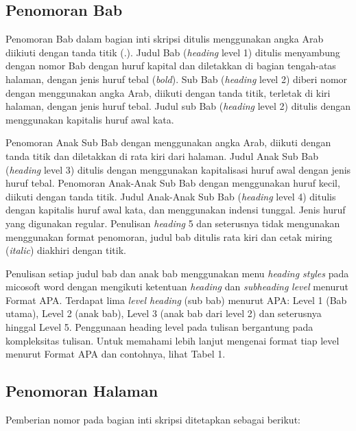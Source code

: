 \documentclass[
  indonesian,
  letterpaper,
]{scrbook}
\begin{document}
\subsection{Penomoran Bab}\label{penomoran-bab}

Penomoran Bab dalam bagian inti skripsi ditulis menggunakan angka Arab
diikiuti dengan tanda titik (.). Judul Bab (\emph{heading} level 1)
ditulis menyambung dengan nomor Bab dengan huruf kapital dan diletakkan
di bagian tengah-atas halaman, dengan jenis huruf tebal (\emph{bold}).
Sub Bab (\emph{heading} level 2) diberi nomor dengan menggunakan angka
Arab, diikuti dengan tanda titik, terletak di kiri halaman, dengan jenis
huruf tebal. Judul sub Bab (\emph{heading} level 2) ditulis dengan
menggunakan kapitalis huruf awal kata.

Penomoran Anak Sub Bab dengan menggunakan angka Arab, diikuti dengan
tanda titik dan diletakkan di rata kiri dari halaman. Judul Anak Sub Bab
(\emph{heading} level 3) ditulis dengan menggunakan kapitalisasi huruf
awal dengan jenis huruf tebal. Penomoran Anak-Anak Sub Bab dengan
menggunakan huruf kecil, diikuti dengan tanda titik. Judul Anak-Anak Sub
Bab (\emph{heading} level 4) ditulis dengan kapitalis huruf awal kata,
dan menggunakan indensi tunggal. Jenis huruf yang digunakan regular.
Penulisan \emph{heading} 5 dan seterusnya tidak mengunakan menggunakan
format penomoran, judul bab ditulis rata kiri dan cetak miring
(\emph{italic}) diakhiri dengan titik.

Penulisan setiap judul bab dan anak bab menggunakan menu \emph{heading
styles} pada micosoft word dengan mengikuti ketentuan \emph{heading} dan
\emph{subheading} \emph{level} menurut Format APA. Terdapat lima
\emph{level heading} (sub bab) menurut APA: Level 1 (Bab utama), Level 2
(anak bab), Level 3 (anak bab dari level 2) dan seterusnya hinggal Level
5. Penggunaan heading level pada tulisan bergantung pada kompleksitas
tulisan. Untuk memahami lebih lanjut mengenai format tiap level menurut
Format APA dan contohnya, lihat Tabel 1.

\subsection{Penomoran Halaman}\label{penomoran-halaman-1}

Pemberian nomor pada bagian inti skripsi ditetapkan sebagai berikut:
\end{document}
